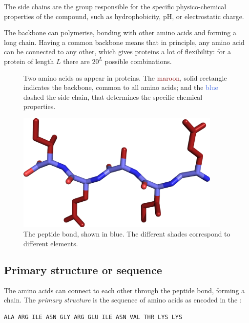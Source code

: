 The side chains are the group responsible for the specific physico-chemical properties of the compound, such as hydrophobicity, pH, or electrostatic charge.

The backbone can polymerise, bonding with other amino acids and forming a long chain.
Having a common backbone means that in principle, any amino acid can be connected to any other, which gives proteins a lot of flexibility:
for a protein of length $L$ there are $20^L$ possible combinations. %

\begin{figure}
\centering
\hfil %
\hfil %
\hfil %
\caption{Two amino acids as appear in proteins.
The \textcolor{Maroon}{maroon}, solid rectangle indicates the backbone, common to all amino acids; and the \textcolor{RoyalBlue}{blue} dashed the side chain, that determines the specific chemical properties.}\label{fig:amino_acids}
\end{figure}


\begin{figure}
\centering
\includegraphics[width=0.9\textwidth]{bioinfo/figures/bond}
\caption{The peptide bond, shown in blue. The different shades correspond to different elements.}\label{fig:bond}
\end{figure}

\subsection{Primary structure or sequence}
The amino acids can connect to each other through the peptide bond, forming a chain.
The \emph{primary structure} is the sequence of amino acids as encoded in the \DNA:
\begin{center}
\texttt{ALA ARG ILE ASN GLY ARG GLU ILE ASN VAL THR LYS LYS}
\end{center}


